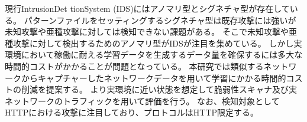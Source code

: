 現行IntrusionDet tionSystem (IDS)にはアノマリ型とシグネチャ型が存在している。
パターンファイルをセッティングするシグネチャ型は既存攻撃には強いが未知攻撃や亜種攻撃に対しては検知できない課題がある。
そこで未知攻撃や亜種攻撃に対して検出するためのアノマリ型がIDSが注目を集めている。
しかし実環境において稼働に耐える学習データを生成するデータ量を確保するには多大な時間的コストがかかることが問題となっている。
本研究では類似するネットワークからキャプチャーしたネットワークデータを用いて学習にかかる時間的コストの削減を提案する。
より実環境に近い状態を想定して脆弱性スキャナ及び実ネットワークのトラフィックを用いて評価を行う。
なお、検知対象としてHTTPにおける攻撃に注目しており、プロトコルはHTTP限定する。
